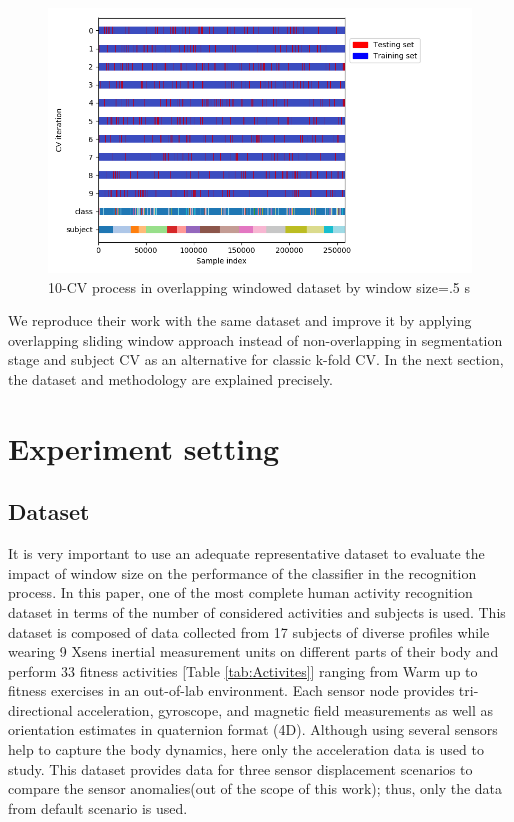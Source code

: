 \begin{itemize}
\begin{figure}[h]
    \centering
    \includegraphics[width=.5\textwidth]{Figures/ShuffleSplit.png}
    \caption{10-CV process in overlapping windowed dataset by window size=.5 s }
    \label{fig:Shuffle-cv}
\end{figure}

\end{itemize}

We reproduce their work with the same dataset and improve it by applying overlapping sliding window approach instead of non-overlapping in segmentation stage and subject CV as an alternative for classic k-fold CV. In the next section, the dataset and methodology are explained precisely.

\section{Experiment setting}

\subsection{Dataset} \label{sec:dataset}
It is very important to use an adequate representative dataset to evaluate the impact of window size on the performance of the classifier in the recognition process. In this paper, one of the most complete human activity recognition dataset \cite{banos2012benchmark} in terms of the number of considered activities and subjects is used. This dataset is composed of data collected from 17 subjects of diverse profiles while wearing 9 Xsens inertial measurement units on different parts of their body and perform 33 fitness activities [Table \ref{tab:Activites}] ranging from Warm up to fitness exercises in an out-of-lab environment. Each sensor node provides tri-directional acceleration, gyroscope, and magnetic field
measurements as well as orientation estimates in quaternion format (4D). Although using several sensors help to capture the body dynamics, here only the acceleration data is used to study. This dataset provides data for three sensor displacement scenarios to compare the sensor anomalies(out of the scope of this work); thus, only the data from default scenario is used.

